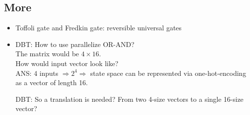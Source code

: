 \documentclass[12pt]{article}
\begin{document}
\subsection{More}
\begin{itemize}
\item Toffoli gate and Fredkin gate: reversible universal gates
\item
  DBT: How to use parallelize OR-AND?\\
  The matrix would be $4 \times 16$.\\
  How would input vector look like?\\
  ANS: 4 inputs $\Rightarrow 2^4 \Rightarrow$ state space can be
  represented via one-hot-encoding as a vector of length 16. 
  
  DBT: So a translation is needed? From two 4-size vectors to a
  single 16-size vector?
\end{itemize}
\end{document}
